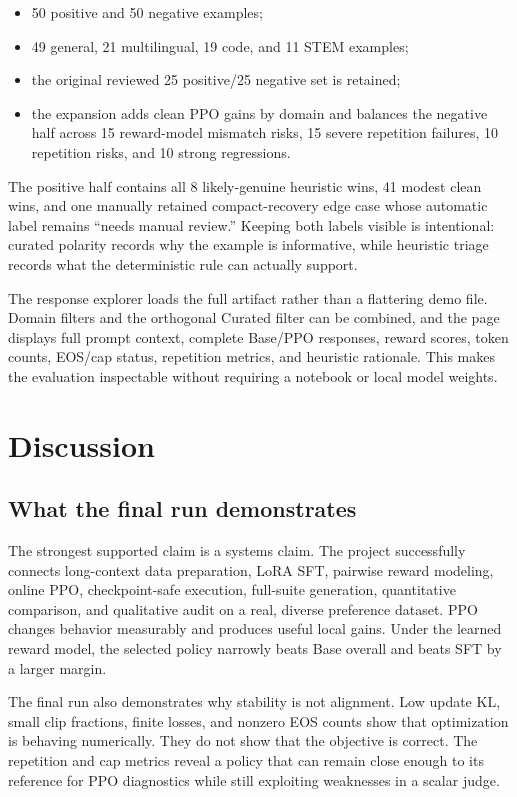 \documentclass[11pt]{article}
\begin{document}
\begin{itemize}
  \item 50 positive and 50 negative examples;
  \item 49 general, 21 multilingual, 19 code, and 11 STEM examples;
  \item the original reviewed 25 positive/25 negative set is retained;
  \item the expansion adds clean PPO gains by domain and balances the negative
  half across 15 reward-model mismatch risks, 15 severe repetition failures,
  10 repetition risks, and 10 strong regressions.
\end{itemize}

The positive half contains all 8 likely-genuine heuristic wins, 41 modest
clean wins, and one manually retained compact-recovery edge case whose
automatic label remains ``needs manual review.'' Keeping both labels visible
is intentional: curated polarity records why the example is informative,
while heuristic triage records what the deterministic rule can actually
support.

The response explorer loads the full artifact rather than a flattering demo
file. Domain filters and the orthogonal Curated filter can be combined, and
the page displays full prompt context, complete Base/PPO responses, reward
scores, token counts, EOS/cap status, repetition metrics, and heuristic
rationale. This makes the evaluation inspectable without requiring a notebook
or local model weights.

\section{Discussion}

\subsection{What the final run demonstrates}

The strongest supported claim is a systems claim. The project successfully
connects long-context data preparation, LoRA SFT, pairwise reward modeling,
online PPO, checkpoint-safe execution, full-suite generation, quantitative
comparison, and qualitative audit on a real, diverse preference dataset. PPO
changes behavior measurably and produces useful local gains. Under the learned
reward model, the selected policy narrowly beats Base overall and beats SFT by
a larger margin.

The final run also demonstrates why stability is not alignment. Low update KL,
small clip fractions, finite losses, and nonzero EOS counts show that
optimization is behaving numerically. They do not show that the objective is
correct. The repetition and cap metrics reveal a policy that can remain close
enough to its reference for PPO diagnostics while still exploiting weaknesses
in a scalar judge.
\end{document}
